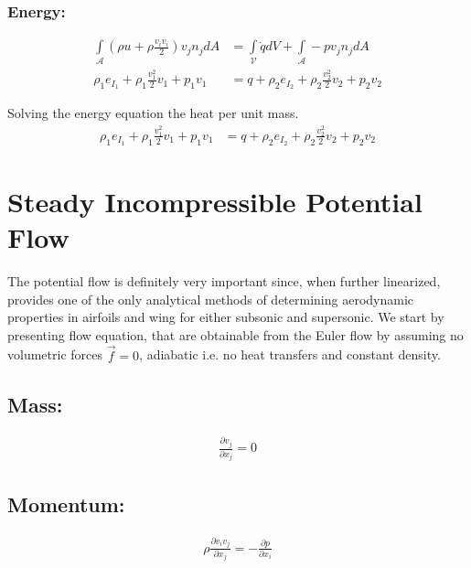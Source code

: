 \subsubsection*{Energy:}
\begin{align}
     \int\limits_{\mathcal{A}} (\rho u + \rho\frac{v_i v_i}{2}) v_j n_j dA &=  \int\limits_{\mathcal{V}} \dot{q} dV + \int\limits_{\mathcal{A}} - p v_j n_j dA \\
     \rho_1 e_{I_1} + \rho_1\frac{v^2_1 }{2} v_1  + p_1 v_1 &= q + \rho_2 e_{I_2} + \rho_2\frac{v^2_2 }{2} v_2 +  p_2 v_2
\end{align}

Solving the energy equation the heat per unit mass.
\begin{align}
     \rho_1 e_{I_1} + \rho_1\frac{v^2_1 }{2} v_1  + p_1 v_1 &= q + \rho_2 e_{I_2} + \rho_2\frac{v^2_2 }{2} v_2 +  p_2 v_2
\end{align}




\newpage
\section{Steady Incompressible Potential Flow}
The potential flow is definitely very important since, when further linearized, provides one of the only analytical methods of determining aerodynamic properties in airfoils and wing for either subsonic and supersonic.
We start by presenting flow equation, that are obtainable from the Euler flow by assuming no volumetric forces $\vec{f}=0$, adiabatic i.e. no heat transfers and constant density.

\subsection*{Mass:}
\begin{align}
    \label{mass_potential}
    \frac{\partial v_j}{\partial x_j} = 0 
\end{align}

\subsection*{Momentum:}
\begin{align}
    \label{momentum_potential}
    \rho \frac{\partial v_i v_j}{\partial x_j}= - \frac{\partial p}{\partial x_i}
\end{align}


